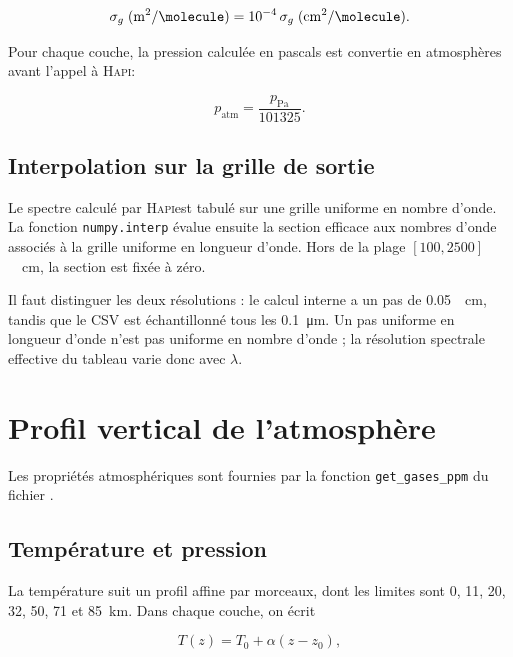 \documentclass[11pt,a4paper]{article}
\newcommand{\HAPI}{\textsc{Hapi}}
\begin{document}
\begin{equation}
  \sigma_g\;(\si{\metre\squared\per\molecule})
  = 10^{-4}\,
    \sigma_g\;(\si{\centi\metre\squared\per\molecule}).
  \label{eq:conversion_section}
\end{equation}

Pour chaque couche, la pression calculée en pascals est convertie en
atmosphères avant l'appel à \HAPI :

\begin{equation}
  p_{\mathrm{atm}} = \frac{p_{\mathrm{Pa}}}{101325}.
\end{equation}

\subsection{Interpolation sur la grille de sortie}

Le spectre calculé par \HAPI est tabulé sur une grille uniforme en nombre
d'onde. La fonction \texttt{numpy.interp} évalue ensuite la section efficace
aux nombres d'onde associés à la grille uniforme en longueur d'onde. Hors de
la plage $[100,2500]$~\si{\per\centi\metre}, la section est fixée à zéro.

Il faut distinguer les deux résolutions : le calcul interne a un pas de
\SI{0.05}{\per\centi\metre}, tandis que le CSV est échantillonné tous les
\SI{0.1}{\micro\metre}. Un pas uniforme en longueur d'onde n'est pas uniforme
en nombre d'onde ; la résolution spectrale effective du tableau varie donc
avec $\lambda$.

\section{Profil vertical de l'atmosphère}

Les propriétés atmosphériques sont fournies par la fonction
\texttt{get\_gases\_ppm} du fichier
.

\subsection{Température et pression}

La température suit un profil affine par morceaux, dont les limites sont
0, 11, 20, 32, 50, 71 et \SI{85}{\kilo\metre}. Dans chaque couche, on écrit

\begin{equation}
  T(z)=T_0+\alpha(z-z_0),
\end{equation}
\end{document}
